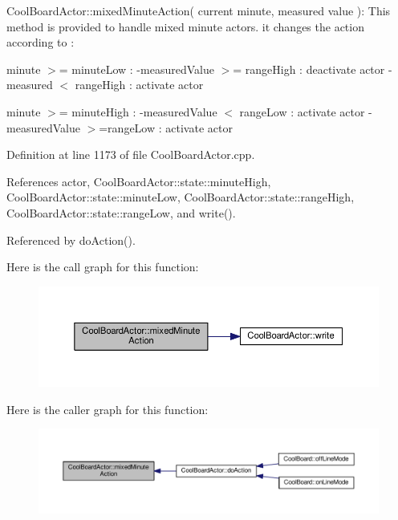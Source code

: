 Cool\+Board\+Actor\+::mixed\+Minute\+Action( current minute, measured value )\+: This method is provided to handle mixed minute actors. it changes the action according to \+:

minute $>$= minute\+Low \+: -\/measured\+Value $>$= range\+High \+: deactivate actor -\/measured $<$ range\+High \+: activate actor

minute $>$= minute\+High \+: -\/measured\+Value $<$ range\+Low \+: activate actor -\/measured\+Value $>$=range\+Low \+: activate actor 

Definition at line 1173 of file Cool\+Board\+Actor.\+cpp.



References actor, Cool\+Board\+Actor\+::state\+::minute\+High, Cool\+Board\+Actor\+::state\+::minute\+Low, Cool\+Board\+Actor\+::state\+::range\+High, Cool\+Board\+Actor\+::state\+::range\+Low, and write().



Referenced by do\+Action().

Here is the call graph for this function\+:\nopagebreak
\begin{figure}[H]
\begin{center}
\leavevmode
\includegraphics[width=350pt]{dc/d69/class_cool_board_actor_a2b8a79a27288d5246e3e3860ae76770d_cgraph}
\end{center}
\end{figure}
Here is the caller graph for this function\+:\nopagebreak
\begin{figure}[H]
\begin{center}
\leavevmode
\includegraphics[width=350pt]{dc/d69/class_cool_board_actor_a2b8a79a27288d5246e3e3860ae76770d_icgraph}
\end{center}
\end{figure}
\mbox{\label{class_cool_board_actor_a1eb1fbca19bc80aad20d2686d52317f8}} 

